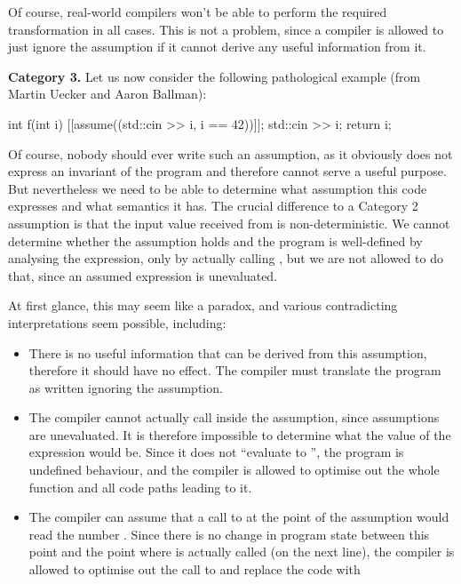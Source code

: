 Of course, real-world compilers won't be able to perform the required transformation in all cases. This is not a problem, since a compiler is allowed to just ignore the assumption if it cannot derive any useful information from it.

\textbf{Category 3.} Let us now consider the following pathological example (from Martin Uecker and Aaron Ballman):

\begin{codeblock}
int f(int i) {
  [[assume((std::cin >> i, i == 42))]];
  std::cin >> i;
  return i;
}
\end{codeblock}

Of course, nobody should ever write such an assumption, as it obviously does not express an invariant of the program and therefore cannot serve a useful purpose. But nevertheless we need to be able to determine what assumption this code expresses and what semantics it has. The crucial difference to a Category 2 assumption is that the input value received from  is non-deterministic. We cannot determine whether the assumption holds and the program is well-defined by analysing the expression, only by actually calling , but we are not allowed to do that, since an assumed expression is unevaluated.

At first glance, this may seem like a paradox, and various contradicting interpretations seem possible, including:
\begin{itemize}
\item There is no useful information that can be derived from this assumption, therefore it should have no effect. The compiler must translate the program as written ignoring the assumption.
\item The compiler cannot actually call  inside the assumption, since assumptions are unevaluated. It is therefore impossible to determine what the value of the expression would be. Since it does not ``evaluate to '', the program is undefined behaviour, and the compiler is allowed to optimise out the whole function  and all code paths leading to it.
\item The compiler can assume that a call to  at the point of the assumption would read the number . Since there is no change in program state between this point and the point where  is actually called (on the next line), the compiler is allowed to optimise out the call to  and replace the code with 
\end{itemize}

